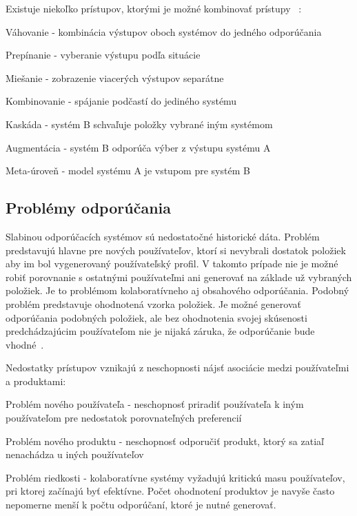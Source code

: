 Existuje niekoľko prístupov, ktorými je možné kombinovať prístupy ~\cite{burke2002hybrid}:

\begin{my_itemize}
	\item{Váhovanie} - kombinácia výstupov oboch systémov do jedného odporúčania
	\item{Prepínanie} - vyberanie výstupu podľa situácie
	\item{Miešanie} - zobrazenie viacerých výstupov separátne
	\item{Kombinovanie} - spájanie podčastí do jediného systému
	\item{Kaskáda} - systém B schvaľuje položky vybrané iným systémom
	\item{Augmentácia} - systém B odporúča výber z výstupu systému A
	\item{Meta-úroveň} - model systému A je vstupom pre systém B
\end{my_itemize}

\subsection{Problémy odporúčania}
\label{recommender_problems}

Slabinou odporúčacích systémov sú nedostatočné historické dáta. Problém predstavujú hlavne pre nových používateľov, ktorí si nevybrali dostatok položiek aby im bol vygenerovaný používateľský profil. V takomto prípade nie je možné robiť porovnanie s ostatnými používateľmi ani generovať na základe už vybraných položiek. Je to problémom kolaboratívneho aj obsahového odporúčania. Podobný problém predstavuje ohodnotená vzorka položiek. Je možné generovať odporúčania podobných položiek, ale bez ohodnotenia svojej skúsenosti predchádzajúcim používateľom nie je nijaká záruka, že odporúčanie bude vhodné~\cite{adomavicius2005toward}.

Nedostatky prístupov vznikajú z neschopnosti nájsť asociácie medzi používateľmi a produktami:

\begin{my_itemize}
	\item{Problém nového používateľa} - neschopnosť priradiť používateľa k iným používateľom pre nedostatok porovnateľných preferencií
	\item{Problém nového produktu} - neschopnosť odporučiť produkt, ktorý sa zatiaľ nenachádza u iných používateľov
	\item{Problém riedkosti} - kolaboratívne systémy vyžadujú kritickú masu používateľov, pri ktorej začínajú byť efektívne. Počet ohodnotení produktov je navyše často nepomerne menší k počtu odporúčaní, ktoré je nutné generovať.
\end{my_itemize} 

